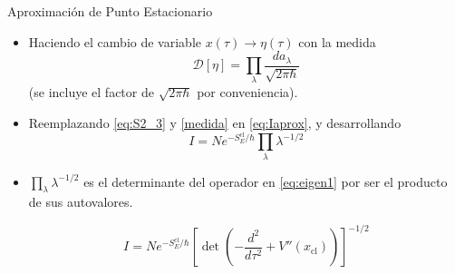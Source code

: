 \documentclass{beamer}
\theoremstyle{example}
\theoremstyle{example}
\begin{document}
\begin{frame}{Aproximación de Punto Estacionario}
\begin{itemize}
    \item Haciendo el cambio de variable $x(\tau) \rightarrow \eta(\tau)$ con la medida
    \begin{equation}\label{medida}
        \mathcal{D}[\eta] = \prod_\lambda \frac{da_\lambda}{\sqrt{2\pi \hbar}}
    \end{equation}
    (se incluye el factor de $\sqrt{2\pi \hbar}$ por conveniencia).
    
    \item Reemplazando \eqref{eq:S2_3} y \eqref{medida} en \eqref{eq:Iaprox}, y desarrollando
    \begin{equation}
        I = N e^{-S_E^{\textrm{cl}}/\hbar} \prod_\lambda \lambda^{ -1/2}
    \end{equation}
    
    \item $\prod_\lambda \lambda^{ -1/2}$ es el determinante del operador en \eqref{eq:eigen1} por ser el producto de sus autovalores.
    
    \begin{equation}\label{Isaddle}
        \boxed{I = Ne^{-S_E^{\textrm{cl}} / \hbar} \left[ \det\left(-\frac{d^2}{d\tau^2} + V''(x_{\textrm{cl}}) \right)\right]^{-1/2}}
    \end{equation}
\end{itemize}
\end{frame}
\end{document}
